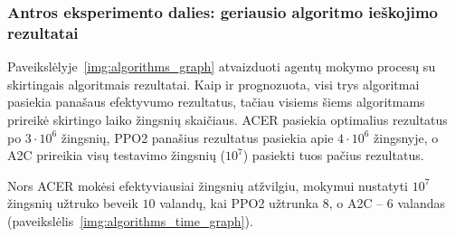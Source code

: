 \documentclass{VUMIFPSbakalaurinis}
\begin{document}
\subsubsection{Antros eksperimento dalies: geriausio algoritmo ieškojimo rezultatai}
{
	Paveikslėlyje~\ref{img:algorithms_graph} atvaizduoti agentų mokymo procesų su skirtingais algoritmais rezultatai. Kaip ir prognozuota, visi trys algoritmai pasiekia panašaus efektyvumo rezultatus, tačiau visiems šiems algoritmams prireikė skirtingo laiko žingsnių skaičiaus. ACER pasiekia optimalius rezultatus po \(3\cdot10^6\) žingsnių, PPO2 panašius rezultatus pasiekia apie \(4\cdot10^6\) žingsnyje, o A2C prireikia visų testavimo žingsnių (\(10^7\)) pasiekti tuos pačius rezultatus.\par
	Nors ACER mokėsi efektyviausiai žingsnių atžvilgiu, mokymui nustatyti \(10^7\) žingsnių užtruko  beveik \(10\) valandų, kai PPO2 užtrunka \(8\), o A2C -- \(6\) valandas (paveikslėlis~\ref{img:algorithms_time_graph}).
	
}
\end{document}

